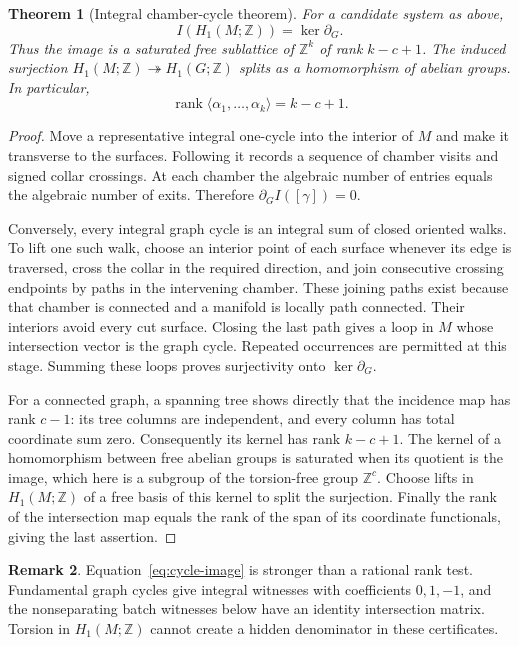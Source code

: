 \documentclass[11pt]{article}
\newtheorem{theorem}{Theorem}[section]
\theoremstyle{definition}
\newtheorem{remark}[theorem]{Remark}
\newcommand{\Z}{\mathbb Z}
\newcommand{\rank}{\operatorname{rank}}
\begin{document}
\begin{theorem}[Integral chamber-cycle theorem]\label{thm:lattice}
For a candidate system as above,
\begin{equation}\label{eq:cycle-image}
 I(H_1(M;\Z))=\ker\partial_G.
\end{equation}
Thus the image is a saturated free sublattice of $\Z^k$ of rank $k-c+1$. The induced surjection $H_1(M;\Z)\twoheadrightarrow H_1(G;\Z)$ splits as a homomorphism of abelian groups. In particular,
\[
 \rank\langle\alpha_1,\ldots,\alpha_k\rangle=k-c+1.
\]
\end{theorem}
\begin{proof}
Move a representative integral one-cycle into the interior of $M$ and make it transverse to the surfaces. Following it records a sequence of chamber visits and signed collar crossings. At each chamber the algebraic number of entries equals the algebraic number of exits. Therefore $\partial_G I([\gamma])=0$.

Conversely, every integral graph cycle is an integral sum of closed oriented walks. To lift one such walk, choose an interior point of each surface whenever its edge is traversed, cross the collar in the required direction, and join consecutive crossing endpoints by paths in the intervening chamber. These joining paths exist because that chamber is connected and a manifold is locally path connected. Their interiors avoid every cut surface. Closing the last path gives a loop in $M$ whose intersection vector is the graph cycle. Repeated occurrences are permitted at this stage. Summing these loops proves surjectivity onto $\ker\partial_G$.

For a connected graph, a spanning tree shows directly that the incidence map has rank $c-1$: its tree columns are independent, and every column has total coordinate sum zero. Consequently its kernel has rank $k-c+1$. The kernel of a homomorphism between free abelian groups is saturated when its quotient is the image, which here is a subgroup of the torsion-free group $\Z^c$. Choose lifts in $H_1(M;\Z)$ of a free basis of this kernel to split the surjection. Finally the rank of the intersection map equals the rank of the span of its coordinate functionals, giving the last assertion.
\end{proof}

\begin{remark}
Equation~\eqref{eq:cycle-image} is stronger than a rational rank test. Fundamental graph cycles give integral witnesses with coefficients $0,1,-1$, and the nonseparating batch witnesses below have an identity intersection matrix. Torsion in $H_1(M;\Z)$ cannot create a hidden denominator in these certificates.
\end{remark}
\end{document}
